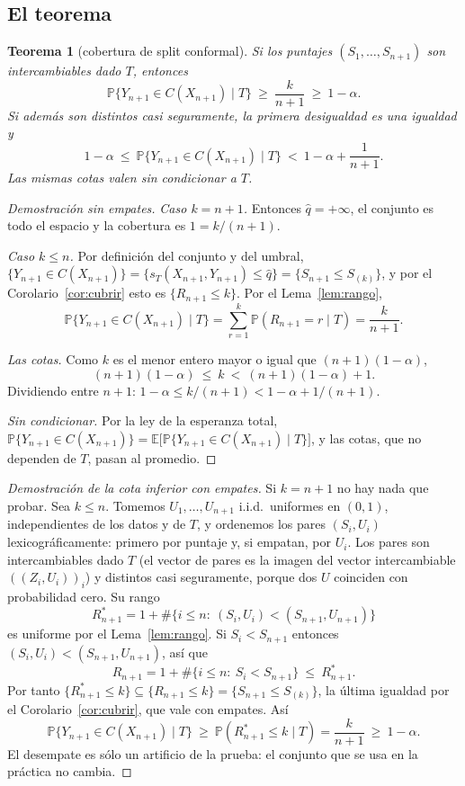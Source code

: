 \documentclass[11pt]{article}
\theoremstyle{plain}
\newtheorem{teorema}{Teorema}[section]
\theoremstyle{definition}
\theoremstyle{remark}
\newcommand{\Prob}{\mathbb P}
\newcommand{\E}{\mathbb E}
\newcommand{\qhat}{\widehat q}
\begin{document}
\subsection{El teorema}
\begin{teorema}[cobertura de split conformal]\label{teo:split}
Si los puntajes $(S_1,\dots,S_{n+1})$ son intercambiables dado $T$, entonces
\[
 \Prob\{Y_{n+1}\in C(X_{n+1})\mid T\}\ \ge\ \frac{k}{n+1}\ \ge\ 1-\alpha .
\]
Si además son distintos casi seguramente, la primera desigualdad es una igualdad y
\[
 1-\alpha\ \le\ \Prob\{Y_{n+1}\in C(X_{n+1})\mid T\}\ <\ 1-\alpha+\frac1{n+1}.
\]
Las mismas cotas valen sin condicionar a $T$.
\end{teorema}

\begin{proof}[Demostración sin empates]
\emph{Caso $k=n+1$.} Entonces $\qhat=+\infty$, el conjunto es todo el espacio y la cobertura es
$1=k/(n+1)$.

\emph{Caso $k\le n$.} Por definición del conjunto y del umbral,
$\{Y_{n+1}\in C(X_{n+1})\}=\{s_T(X_{n+1},Y_{n+1})\le\qhat\}=\{S_{n+1}\le S_{(k)}\}$, y por el
Corolario~\ref{cor:cubrir} esto es $\{R_{n+1}\le k\}$. Por el Lema~\ref{lem:rango},
\[
 \Prob\{Y_{n+1}\in C(X_{n+1})\mid T\}=\sum_{r=1}^{k}\Prob(R_{n+1}=r\mid T)=\frac{k}{n+1}.
\]

\emph{Las cotas.} Como $k$ es el menor entero mayor o igual que $(n+1)(1-\alpha)$,
\[
 (n+1)(1-\alpha)\ \le\ k\ <\ (n+1)(1-\alpha)+1 .
\]
Dividiendo entre $n+1$: $1-\alpha\le k/(n+1)<1-\alpha+1/(n+1)$.

\emph{Sin condicionar.} Por la ley de la esperanza total,
$\Prob\{Y_{n+1}\in C(X_{n+1})\}=\E\bigl[\Prob\{Y_{n+1}\in C(X_{n+1})\mid T\}\bigr]$, y las cotas, que
no dependen de $T$, pasan al promedio.
\end{proof}

\begin{proof}[Demostración de la cota inferior con empates]
Si $k=n+1$ no hay nada que probar. Sea $k\le n$. Tomemos $U_1,\dots,U_{n+1}$ i.i.d.\ uniformes en
$(0,1)$, independientes de los datos y de $T$, y ordenemos los pares $(S_i,U_i)$
lexicográficamente: primero por puntaje y, si empatan, por $U_i$. Los pares son intercambiables dado
$T$ (el vector de pares es la imagen del vector intercambiable $((Z_i,U_i))_i$) y distintos casi
seguramente, porque dos $U$ coinciden con probabilidad cero. Su rango
\[
 R^*_{n+1}=1+\#\{i\le n:\ (S_i,U_i)<(S_{n+1},U_{n+1})\}
\]
es uniforme por el Lema~\ref{lem:rango}. Si $S_i<S_{n+1}$ entonces $(S_i,U_i)<(S_{n+1},U_{n+1})$, así
que
\[
 R_{n+1}=1+\#\{i\le n:\ S_i<S_{n+1}\}\ \le\ R^*_{n+1}.
\]
Por tanto $\{R^*_{n+1}\le k\}\subseteq\{R_{n+1}\le k\}=\{S_{n+1}\le S_{(k)}\}$, la última igualdad por
el Corolario~\ref{cor:cubrir}, que vale con empates. Así
\[
 \Prob\{Y_{n+1}\in C(X_{n+1})\mid T\}\ \ge\ \Prob(R^*_{n+1}\le k\mid T)=\frac{k}{n+1}\ \ge\ 1-\alpha.
\]
El desempate es sólo un artificio de la prueba: el conjunto que se usa en la práctica no cambia.
\end{proof}
\end{document}

